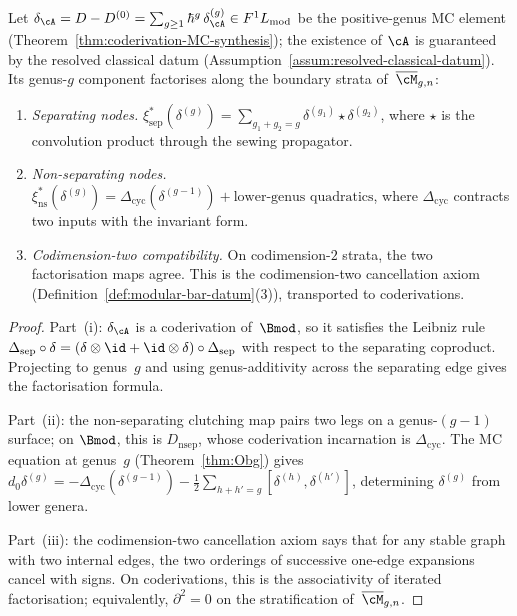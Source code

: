 \begin{proposition}
\label{prop:factorisation-boundary-strata}
Let $\delta_\cA = D - D^{(0)} = \sum_{g \ge 1} \hbar^g\,
\delta^{(g)}_\cA \in F^1 L_{\mathrm{mod}}$ be the positive-genus
MC element
\textup{(}Theorem~\textup{\ref{thm:coderivation-MC-synthesis})};
the existence of $\cA$ is guaranteed by the resolved classical
datum \textup{(}Assumption~\textup{\ref{assum:resolved-classical-datum})}.
Its genus-$g$ component factorises along the boundary strata
of~$\overline{\cM}_{g,n}$:
\begin{enumerate}[label=\textup{(\roman*)}]
\item \emph{Separating nodes.}
 $\xi_{\mathrm{sep}}^*(\delta^{(g)})
 = \sum_{g_1+g_2=g}
 \delta^{(g_1)} \star \delta^{(g_2)}$,
 where $\star$ is the convolution product through the sewing
 propagator.

\item \emph{Non-separating nodes.}
 $\xi_{\mathrm{ns}}^*(\delta^{(g)})
 = \Delta_{\mathrm{cyc}}(\delta^{(g-1)})
 + \text{lower-genus quadratics}$,
 where $\Delta_{\mathrm{cyc}}$ contracts two inputs with the
 invariant form.

\item \emph{Codimension-two compatibility.}
 On codimension-$2$ strata, the two factorisation maps agree.
 This is the codimension-two cancellation axiom
 (Definition~\ref{def:modular-bar-datum}(3)), transported to
 coderivations.
\end{enumerate}
\end{proposition}

\begin{proof}
Part~(i): $\delta_\cA$ is a coderivation
of~$\Bmod$, so it satisfies the Leibniz rule
$\Delta_{\mathrm{sep}} \circ \delta = (\delta \otimes \id +
\id \otimes \delta) \circ \Delta_{\mathrm{sep}}$
with respect to the separating coproduct. Projecting to
genus~$g$ and using genus-additivity across the separating edge
gives the factorisation formula.

Part~(ii): the non-separating clutching map pairs two legs on
a genus-$(g{-}1)$ surface; on $\Bmod$, this is
$D_{\mathrm{nsep}}$, whose coderivation incarnation is
$\Delta_{\mathrm{cyc}}$. The MC equation at genus~$g$
(Theorem~\ref{thm:Obg}) gives
$d_0\delta^{(g)} = -\Delta_{\mathrm{cyc}}(\delta^{(g-1)})
- \tfrac{1}{2}\sum_{h+h'=g} [\delta^{(h)}, \delta^{(h')}]$,
determining $\delta^{(g)}$ from lower genera.

Part~(iii): the codimension-two cancellation axiom says that
for any stable graph with two internal edges, the two orderings
of successive one-edge expansions cancel with signs. On
coderivations, this is the associativity of iterated
factorisation; equivalently, $\partial^2 = 0$ on the
stratification of~$\overline{\cM}_{g,n}$.
\end{proof}

